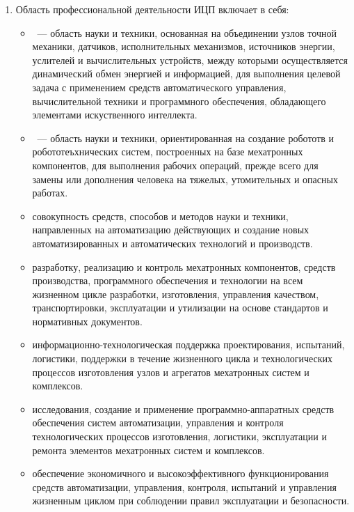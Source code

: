 
\begin{enumerate}
  \item Область профессиональной деятельности ИЦП включает в себя: 
  \begin{itemize}[nosep]
    
    \item {}\ --- область науки и техники,
    основанная на объединении узлов точной механики, датчиков, исполнительных
    механизмов, источников энергии, услителей и вычислительных устройств, между
    которыми осуществляется динамический обмен энергией и информацией, для
    выполнения целевой задача с применением средств автоматического управления,
    вычислительной техники и программного обеспечения, обладающего элементами
    искуственного интеллекта.
     
    \item {}\ --- область науки и техники,
    ориентированная на создание робототв и робототеъхнических систем,
    построенных на базе мехатронных компонентов, для выполнения рабочих
    операций, прежде всего для замены или дополнения человека на тяжелых,
    утомительных и опасных работах.
    
    \item совокупность средств, способов и методов науки и техники, направленных
    на автоматизацию действующих и создание новых автоматизированных и
    автоматических технологий и производств.
    
    \item разработку, реализацию и контроль мехатронных компонентов, средств 
    производства, программного обеспечения и технологии на всем жизненном цикле
    разработки, изготовления, управления качеством, транспортировки,
    эксплуатации и утилизации на основе стандартов и нормативных документов.
    
    \item информационно-технологическая поддержка проектирования, испытаний,
    логистики, поддержки в течение жизненного цикла и технологических процессов
    изготовления узлов и агрегатов мехатронных систем и комплексов.
    
    \item исследования, создание и применение программно-аппаратных средств
    обеспечения систем автоматизации, управления и контроля технологических
    процессов изготовления, логистики, эксплуатации и ремонта элементов
    мехатронных систем и комплексов.
    
    \item обеспечение экономичного и высокоэффективного функционирования средств
    автоматизации, управления, контроля, испытаний и управления жизненным циклом
    при соблюдении правил эксплуатации и безопасности.
     
  \end{itemize}
\end{enumerate}